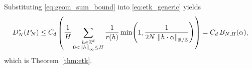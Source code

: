 Substituting \eqref{eq:geom_sum_bound} into \eqref{eq:etk_generic} yields
\[
D_N^\ast(P_N)\le C_d\left(
\frac{1}{H}
\sum_{\substack{h\in\mathbb{Z}^d\\0<\left\lVert h\right\rVert_{\infty}\le H}}
\frac{1}{r(h)}
\min\!\left(1,\frac{1}{2N\,\left\lVert h\cdot\alpha\right\rVert_{\mathbb{R}/\mathbb{Z}}}\right)
\right)
=C_d\,B_{N,H}(\alpha),
\]
which is Theorem~\ref{thm:etk}.


